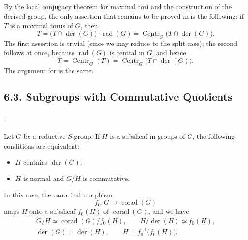 By the local conjugacy theorem for maximal tori and the
construction of the derived group, the only assertion that
remains to be proved in \textup{} is the following: if \(T\)
is a maximal torus of \(G\), then
\[
  T
  =
  \bigl(T\cap\operatorname{der}(G)\bigr)\cdot
    \operatorname{rad}(G)
  =
  \underline{\operatorname{Centr}}_G
    \bigl(T\cap\operatorname{der}(G)\bigr).
\]
The first assertion is trivial \textup{(since we may reduce to
the split case)}; the second follows at once, because
\(\operatorname{rad}(G)\) is central in \(G\), and hence
\[
  T
  =
  \underline{\operatorname{Centr}}_G(T)
  =
  \underline{\operatorname{Centr}}_G
    \bigl(T\cap\operatorname{der}(G)\bigr).
\]
The argument for \textup{} is the same.

\subsection*{6.3. Subgroups with Commutative Quotients}

\paragraph{.}
Let \(G\) be a reductive \(S\)-group. If \(H\) is a subsheaf in
groups of \(G\), the following conditions are equivalent:
\begin{itemize}
\item \(H\) contains \(\operatorname{der}(G)\);
\item \(H\) is normal and \(G/H\) is commutative.
\end{itemize}
In this case, the canonical morphism
\[
  f_0:G\longrightarrow\operatorname{corad}(G)
\]
maps \(H\) onto a subsheaf \(f_0(H)\) of
\(\operatorname{corad}(G)\), and we have
\[
\begin{gathered}
  G/H\simeq\operatorname{corad}(G)/f_0(H),
  \qquad
  H/\operatorname{der}(H)\simeq f_0(H),\\
  \operatorname{der}(G)=\operatorname{der}(H),
  \qquad
  H=f_0^{-1}\bigl(f_0(H)\bigr).
\end{gathered}
\]

